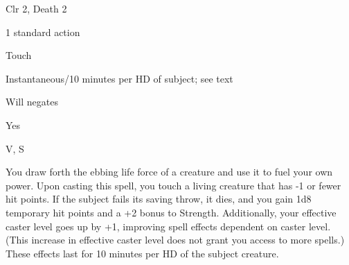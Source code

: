
\begin{description*}
\item[Level:] Clr 2, Death 2
\item[Casting Time:] 1 standard action
\item[Range:] Touch
\item[Duration:] Instantaneous/10 minutes per HD of subject; see text
\item[Saving Throw:] Will negates
\item[Spell Resistance:] Yes
\item[Components:] V, S
\end{description*}

You draw forth the ebbing life force of a creature and use it to fuel your own
power. Upon casting this spell, you touch a living creature that has -1 or fewer
hit points. If the subject fails its saving throw, it dies, and you gain 1d8 temporary
hit points and a +2 bonus to Strength. Additionally, your effective caster level
goes up by +1, improving spell effects dependent on caster level. (This increase
in effective caster level does not grant you access to more spells.) These effects
last for 10 minutes per HD of the subject creature.